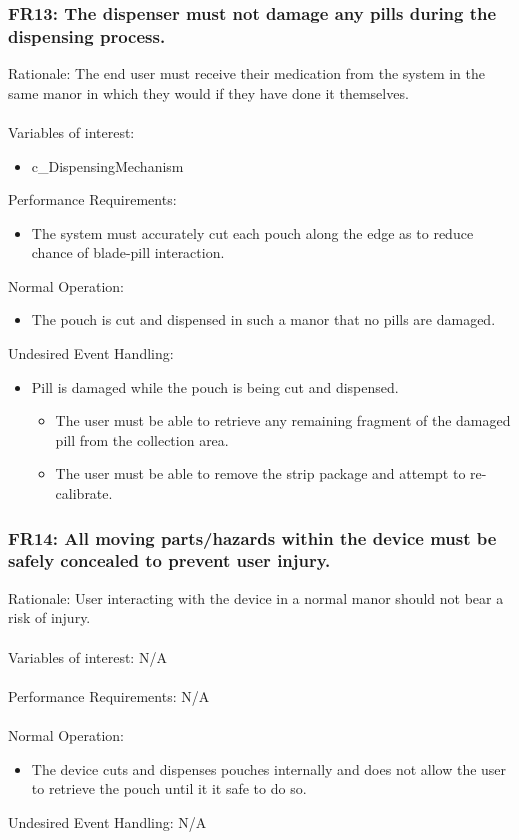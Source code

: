 \documentclass[12pt]{article}
\begin{document}
\subsubsection*{FR13:  The dispenser must not damage any pills during the dispensing process.}
Rationale: The end user must receive their medication from the system in the same manor in which they would if they have done it themselves.
\\\\
Variables of interest:
\begin{itemize}[noitemsep,topsep=0pt]
    \item c\_DispensingMechanism
\end{itemize} 
\bigskip
Performance Requirements:
\begin{itemize}[noitemsep,topsep=0pt]
    \item The system must accurately cut each pouch along the edge as to reduce chance of blade-pill interaction.
\end{itemize}
\bigskip
Normal Operation:
\begin{itemize}[noitemsep,topsep=0pt]
    \item The pouch is cut and dispensed in such a manor that no pills are damaged.
\end{itemize}
\bigskip
Undesired Event Handling:
\begin{itemize}[noitemsep,topsep=0pt]
    \item Pill is damaged while the pouch is being cut and dispensed.
    \begin{itemize}
        \item The user must be able to retrieve any remaining fragment of the damaged pill from the collection area.
        \item The user must be able to remove the strip package and attempt to re-calibrate.
    \end{itemize}
\end{itemize}
\bigskip

\subsubsection*{FR14:  All moving parts/hazards within the device must be safely concealed to prevent user injury.}
Rationale: User interacting with the device in a normal manor should not bear a risk of injury.
\\\\
Variables of interest: N/A
\\ \\
Performance Requirements: N/A
\\ \\
Normal Operation:
\begin{itemize}[noitemsep,topsep=0pt]
    \item The device cuts and dispenses pouches internally and does not allow the user to retrieve the pouch until it it safe to do so.
\end{itemize}
\bigskip
Undesired Event Handling: N/A
\\ \\
\end{document}
